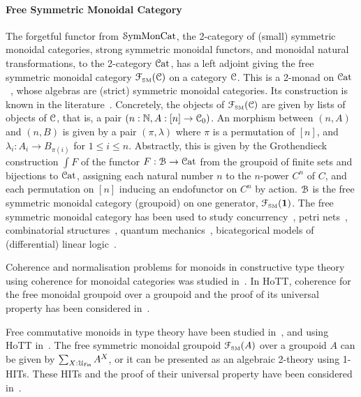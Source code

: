 
\paragraph{Free Symmetric Monoidal Category} The forgetful functor from $\SymMonCat$, the 2-category of (small)
symmetric monoidal categories, strong symmetric monoidal functors, and monoidal natural transformations, to the
2-category $\CatCat$, has a left adjoint giving the free symmetric monoidal category $\FSM[\CCat{C}]$ on a category
$\CCat{C}$. This is a 2-monad on $\CatCat$~\cite{blackwellTwodimensionalMonadTheory1989}, whose algebras are (strict)
symmetric monoidal categories. Its construction is known in the literature~\cite{abramskyAbstractScalarsLoops2005}.
Concretely, the objects of $\FSM[\CCat{C}]$ are given by lists of objects of $\CCat{C}$, that is, a pair $(n:\Nat, A:[n]
    \to \CCat{C}_{0})$. An morphism between $(n,A)$ and $(n,B)$ is given by a pair $(\pi,\lambda)$ where $\pi$ is a
permutation of $[n]$, and $\lambda_{i} : A_{i} \to B_{\pi(i)}$ for $1 \leq i \leq n$. Abstractly, this is given by the
Grothendieck construction $\int F$ of the functor $F : \BFin \to \CatCat$ from the groupoid of finite sets and
bijections to $\CatCat$, assigning each natural number $n$ to the $n$-power $C^{n}$ of $C$, and each permutation on
$[n]$ inducing an endofunctor on $C^{n}$ by action. $\BFin$ is the free symmetric monoidal category (groupoid) on one
generator, $\FSM[\unit]$. The free symmetric monoidal category has been used to study
concurrency~\cite{hylandSymmetricMonoidalSketches2004}, petri nets~\cite{baezCategoriesNets2021}, combinatorial
structures~\cite{fioreCartesianClosedBicategory2008}, quantum mechanics~\cite{abramskyAbstractScalarsLoops2005},
bicategorical models of (differential) linear logic~\cite{melliesTemplateGamesDifferential2019}.

Coherence and normalisation problems for monoids in constructive type theory using coherence for monoidal categories was
studied in~\cite{beylinExtractingProofCoherence1996}. In HoTT, coherence for the free monoidal groupoid over a groupoid
and the proof of its universal property has been considered in~\cite{piceghelloCoherenceMonoidalGroupoids2020}.

Free commutative monoids in type theory have been studied in~\cite{gylterudMultisetsTypeTheory2020}, and using HoTT
in~\cite{choudhuryFinitemultisetConstructionHoTT2019}. The free symmetric monoidal groupoid $\FSM[A]$ over a groupoid
$A$ can be given by $\dsum*{X:\UFin}{A^{X}}$, or it can be presented as an algebraic 2-theory using 1-HITs. These HITs
and the proof of their universal property have been considered
in~\cite*{piceghelloCoherenceSymmetricMonoidal2019,choudhuryFinitemultisetConstructionHoTT2019}.


